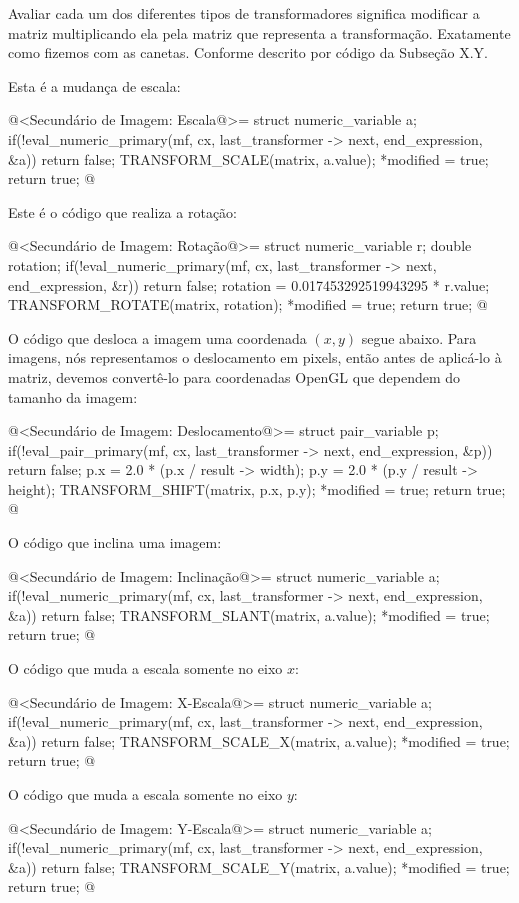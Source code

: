{Avaliar cada um dos diferentes tipos de transformadores significa
modificar a matriz multiplicando ela pela matriz que representa a
transformação. Exatamente como fizemos com as canetas. Conforme
descrito por código da Subseção X.Y.

Esta é a mudança de escala:

\iniciocodigo
@<Secundário de Imagem: Escala@>=
struct numeric_variable a;
if(!eval_numeric_primary(mf, cx, last_transformer -> next, end_expression, &a))
  return false;
TRANSFORM_SCALE(matrix, a.value);
*modified = true;
return true;
@
\fimcodigo

Este é o código que realiza a rotação:

\iniciocodigo
@<Secundário de Imagem: Rotação@>=
struct numeric_variable r;
double rotation;
if(!eval_numeric_primary(mf, cx, last_transformer -> next, end_expression, &r))
  return false;
rotation = 0.017453292519943295 * r.value;
TRANSFORM_ROTATE(matrix, rotation);
*modified = true;
return true;
@
\fimcodigo

O código que desloca a imagem uma coordenada $(x, y)$ segue
abaixo. Para imagens, nós representamos o deslocamento em pixels,
então antes de aplicá-lo à matriz, devemos convertê-lo para
coordenadas OpenGL que dependem do tamanho da imagem:

\iniciocodigo
@<Secundário de Imagem: Deslocamento@>=
struct pair_variable p;
if(!eval_pair_primary(mf, cx, last_transformer -> next, end_expression, &p))
  return false;
p.x = 2.0 * (p.x / result -> width);
p.y = 2.0 * (p.y / result -> height);
TRANSFORM_SHIFT(matrix, p.x, p.y);
*modified = true;
return true;
@
\fimcodigo

O código que inclina uma imagem:

\iniciocodigo
@<Secundário de Imagem: Inclinação@>=
struct numeric_variable a;
if(!eval_numeric_primary(mf, cx, last_transformer -> next, end_expression, &a))
  return false;
TRANSFORM_SLANT(matrix, a.value);
*modified = true;
return true;
@
\fimcodigo

O código que muda a escala somente no eixo $x$:

\iniciocodigo
@<Secundário de Imagem: X-Escala@>=
struct numeric_variable a;
if(!eval_numeric_primary(mf, cx, last_transformer -> next, end_expression, &a))
  return false;
TRANSFORM_SCALE_X(matrix, a.value);
*modified = true;
return true;
@
\fimcodigo

O código que muda a escala somente no eixo $y$:

\iniciocodigo
@<Secundário de Imagem: Y-Escala@>=
struct numeric_variable a;
if(!eval_numeric_primary(mf, cx, last_transformer -> next, end_expression, &a))
  return false;
TRANSFORM_SCALE_Y(matrix, a.value);
*modified = true;
return true;
@
\fimcodigo

}
